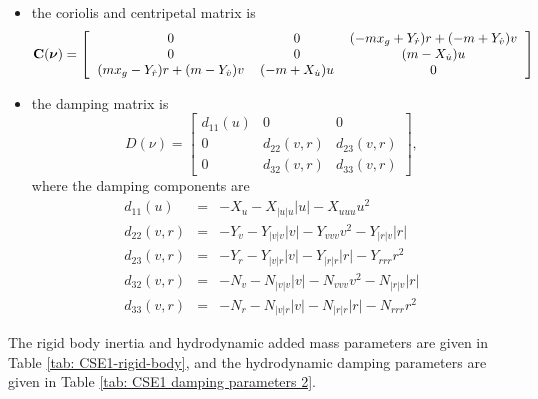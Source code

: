 \begin{itemize}
	\item the coriolis and centripetal matrix is
	\begin{equation*}
	\textbf{C}(\bm{\nu})=\left[ \begin{tabular}{ccc}
	0 & $ 0 $ & $(-mx_g+Y_{\dot{r}})r+(-m+Y_{\dot{v}})v$\\
	0 & 0 & $(m-X_{\dot{u}})u$\\
	$(mx_g-Y_{\dot{r}})r+(m-Y_{\dot{v}})v $ & $(-m+X_{\dot{u}})u$ & 0\\
	\end{tabular} \right]
	\end{equation*}
	\item the damping matrix is
	\[
	D\left(\nu\right)=\left[\begin{array}{ccc}
	d_{11}\left(u\right) & 0 & 0\\
	0 & d_{22}\left(v,r\right) & d_{23}\left(v,r\right)\\
	0 & d_{32}\left(v,r\right) & d_{33}\left(v,r\right)
	\end{array}\right],
	\]
	where the damping components are 
	\begin{eqnarray}
	d_{11}\left(u\right) & = & -X_{u}-X_{\left\vert u\right\vert u}\left\vert u\right\vert -X_{uuu}u^{2}\label{Eq:d11}\\
	d_{22}\left(v,r\right) & = & -Y_{v}-Y_{\left\vert v\right\vert v}\left\vert v\right\vert -Y_{vvv}v^{2}-Y_{\left\vert r\right\vert v}\left\vert r\right\vert \label{Eq:d22}\\
	d_{23}\left(v,r\right) & = & -Y_{r}-Y_{\left\vert v\right\vert r}\left\vert v\right\vert -Y_{\left\vert r\right\vert r}\left\vert r\right\vert -Y_{rrr}r^{2}\label{Eq:d23}\\
	d_{32}\left(v,r\right) & = & -N_{v}-N_{\left\vert v\right\vert v}\left\vert v\right\vert -N_{vvv}v^{2}-N_{\left\vert r\right\vert v}\left\vert r\right\vert \label{Eq:d32}\\
	d_{33}\left(v,r\right) & = & -N_{r}-N_{\left\vert v\right\vert r}\left\vert v\right\vert -N_{\left\vert r\right\vert r}\left\vert r\right\vert -N_{rrr}r^{2}\label{Eq:d33}
	\end{eqnarray}
\end{itemize}
The rigid body inertia and hydrodynamic added mass parameters are given in Table \ref{tab: CSE1-rigid-body}, and the hydrodynamic damping parameters are given in Table \ref{tab: CSE1 damping parameters 2}.

